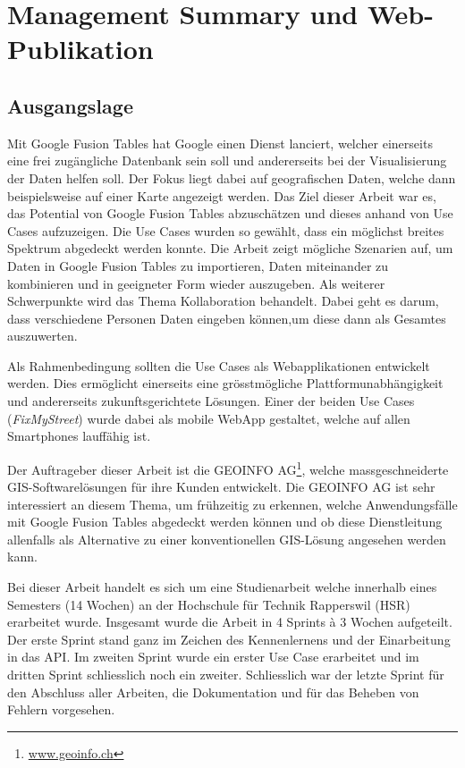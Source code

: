 \chapter*{Management Summary und Web-Publikation}
\thispagestyle{scrheadings}

\section*{Ausgangslage}
Mit Google Fusion Tables hat Google einen Dienst lanciert, welcher einerseits eine frei zugängliche Datenbank sein soll und andererseits bei der Visualisierung der Daten helfen soll. Der Fokus liegt dabei auf geografischen Daten, welche dann beispielsweise auf einer Karte angezeigt werden.
Das Ziel dieser Arbeit war es, das Potential von Google Fusion Tables abzuschätzen und dieses anhand von Use Cases aufzuzeigen. Die Use Cases wurden so gewählt, dass ein möglichst breites Spektrum abgedeckt werden konnte. Die Arbeit zeigt mögliche Szenarien auf, um Daten in Google Fusion Tables zu importieren, Daten miteinander zu kombinieren und in geeigneter Form wieder auszugeben. Als weiterer Schwerpunkte wird das Thema Kollaboration behandelt. Dabei geht es darum, dass verschiedene Personen Daten eingeben können,um diese dann als Gesamtes auszuwerten.

Als Rahmenbedingung sollten die Use Cases als Webapplikationen entwickelt werden. Dies ermöglicht einerseits eine grösstmögliche Plattformunabhängigkeit und andererseits zukunftsgerichtete Lösungen. Einer der beiden Use Cases (\emph{FixMyStreet}) wurde dabei als mobile WebApp gestaltet, welche auf allen Smartphones lauffähig ist.

Der Auftrageber dieser Arbeit ist die GEOINFO AG\footnote{\url{www.geoinfo.ch}}, welche massgeschneiderte \gls{GIS}-Softwarelösungen für ihre Kunden entwickelt. Die GEOINFO AG ist sehr interessiert an diesem Thema, um frühzeitig zu erkennen, welche Anwendungsfälle mit Google Fusion Tables abgedeckt werden können und ob diese Dienstleitung allenfalls als Alternative zu einer konventionellen \gls{GIS}-Lösung angesehen werden kann.

Bei dieser Arbeit handelt es sich um eine Studienarbeit welche innerhalb eines Semesters (14 Wochen) an der Hochschule für Technik Rapperswil (HSR) erarbeitet wurde. Insgesamt wurde die Arbeit in 4 Sprints à 3 Wochen aufgeteilt. Der erste Sprint stand ganz im Zeichen des Kennenlernens und der Einarbeitung in das \gls{API}. Im zweiten Sprint wurde ein erster Use Case erarbeitet und im dritten Sprint schliesslich noch ein zweiter. Schliesslich war der letzte Sprint für den Abschluss aller Arbeiten, die Dokumentation und für das Beheben von Fehlern vorgesehen.

